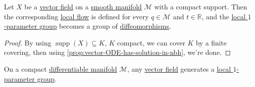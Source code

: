 \begin{theorem}
	Let \(X\) be a \hyperref[def:vector-field]{vector field} on a \hyperref[def:smooth-manifold]{smooth manifold} \(\mathcal{M} \) with a compact support. Then the corresponding \hyperref[def:local-flow]{local flow} is defined for every \(q\in \mathcal{M} \) and \(t\in \mathbb{R} \), and the \hyperref[def:local-1-parameter-group]{local \(1\)-parameter group} becomes a group of \hyperref[def:diffeomorphism]{diffeomorphisms}.
\end{theorem}
\begin{proof}
	By using \(\mathop{\mathrm{supp}}(X) \subseteq K\), \(K\) compact, we can cover \(K\) by a finite covering, then using \autoref{prop:vector-ODE-has-solution-in-nbh}, we're done.
\end{proof}

\begin{corollary}
	On a compact \hyperref[def:smooth-manifold]{differentiable manifold} \(\mathcal{M} \), any \hyperref[def:vector-field]{vector field} generates a \hyperref[def:local-1-parameter-group]{local \(1\)-parameter group}.
\end{corollary}